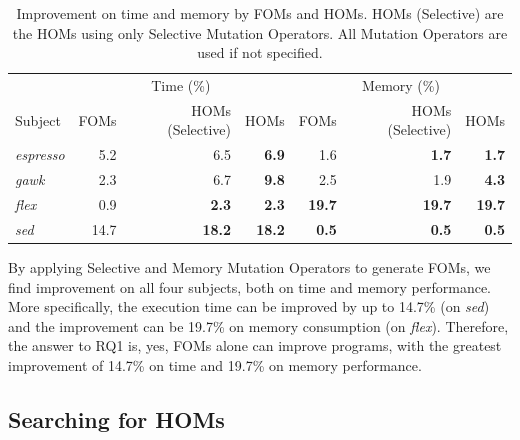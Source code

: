 \documentclass[oribibl]{llncs}
\begin{document}
\begin{table}[ht]
\centering
\caption{Improvement on time and memory by FOMs and HOMs. HOMs (Selective) are the HOMs using only Selective Mutation Operators.
All Mutation Operators are used if not specified.}
\label{tab_fomhom}
\begin{tabular}{lrrrrrr}
\hline
         &      & \multicolumn{1}{c}{Time (\%)} &               &               & \multicolumn{1}{c}{Memory (\%)} &               \\
Subject  & FOMs & HOMs (Selective)         & HOMs          & FOMs          & HOMs (Selective)           & HOMs          \\
\hline
\emph{espresso} & 5.2  & 6.5                      & \textbf{6.9}  & 1.6           & \textbf{1.7}               & \textbf{1.7}  \\
\emph{gawk}     & 2.3  & 6.7                      & \textbf{9.8}  & 2.5           & 1.9                        & \textbf{4.3}  \\
\emph{flex}     & 0.9  & \textbf{2.3}             & \textbf{2.3}  & \textbf{19.7} & \textbf{19.7}              & \textbf{19.7} \\
\emph{sed}      & 14.7 & \textbf{18.2}            & \textbf{18.2} & \textbf{0.5}  & \textbf{0.5}               & \textbf{0.5} \\
\hline
\end{tabular}
\end{table}

By applying Selective and Memory Mutation Operators to generate FOMs, we find improvement on all four subjects, both on time and memory performance.
More specifically, the execution time can be improved by up to 14.7\% (on \emph{sed}) and the improvement can be 19.7\% on memory consumption (on \emph{flex}).
Therefore, the answer to RQ1 is, yes, FOMs alone can improve programs, with the greatest improvement of 14.7\% on time and 19.7\% on memory performance.

\subsection{Searching for HOMs}
\label{sec_reshom}
\end{document}
